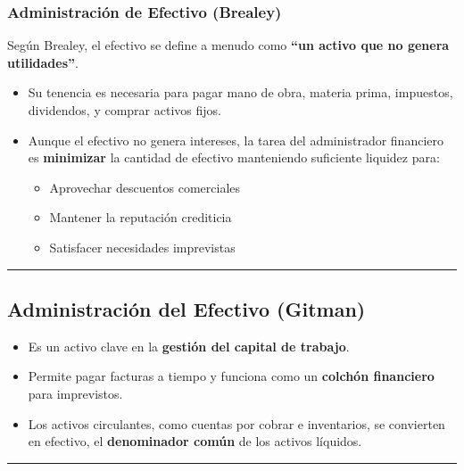 \documentclass[
  letterpaper,
  DIV=11,
  numbers=noendperiod]{scrartcl}
\providecommand{\tightlist}{%
  \setlength{\itemsep}{0pt}\setlength{\parskip}{0pt}}\usepackage{longtable,booktabs,array}
\begin{document}
\subsubsection{Administración de Efectivo
(Brealey)}\label{administraciuxf3n-de-efectivo-brealey}

Según Brealey, el efectivo se define a menudo como \textbf{``un activo
que no genera utilidades''}.

\begin{itemize}
\tightlist
\item
  Su tenencia es necesaria para pagar mano de obra, materia prima,
  impuestos, dividendos, y comprar activos fijos.
\item
  Aunque el efectivo no genera intereses, la tarea del administrador
  financiero es \textbf{minimizar} la cantidad de efectivo manteniendo
  suficiente liquidez para:

  \begin{itemize}
  \tightlist
  \item
    Aprovechar descuentos comerciales
  \item
    Mantener la reputación crediticia
  \item
    Satisfacer necesidades imprevistas
  \end{itemize}
\end{itemize}

\begin{center}\rule{0.5\linewidth}{0.5pt}\end{center}

\subsection{Administración del Efectivo
(Gitman)}\label{administraciuxf3n-del-efectivo-gitman}

\begin{itemize}
\tightlist
\item
  Es un activo clave en la \textbf{gestión del capital de trabajo}.
\item
  Permite pagar facturas a tiempo y funciona como un \textbf{colchón
  financiero} para imprevistos.
\item
  Los activos circulantes, como cuentas por cobrar e inventarios, se
  convierten en efectivo, el \textbf{denominador común} de los activos
  líquidos.
\end{itemize}

\begin{center}\rule{0.5\linewidth}{0.5pt}\end{center}
\end{document}

